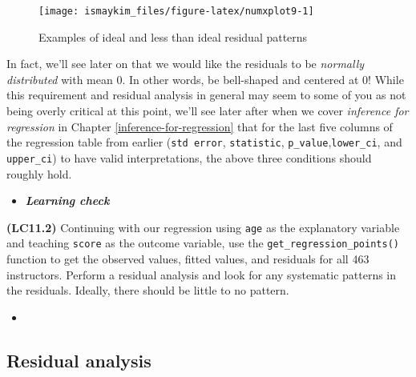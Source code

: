 \documentclass[12pt, krantz2,]{krantz}
\makeatletter
\newenvironment{Shaded}{\begin{snugshade}}{\end{snugshade}}
\newcommand{\CommentTok}[1]{\textcolor[rgb]{0.37,0.37,0.37}{\textit{#1}}}
\newcommand{\DataTypeTok}[1]{\textcolor[rgb]{0.27,0.27,0.27}{#1}}
\newcommand{\DecValTok}[1]{\textcolor[rgb]{0.06,0.06,0.06}{#1}}
\newcommand{\KeywordTok}[1]{\textcolor[rgb]{0.27,0.27,0.27}{\textbf{#1}}}
\newcommand{\NormalTok}[1]{#1}
\newcommand{\OperatorTok}[1]{\textcolor[rgb]{0.43,0.43,0.43}{\textbf{#1}}}
\newcommand{\StringTok}[1]{\textcolor[rgb]{0.5,0.5,0.5}{#1}}
\newenvironment{kframe}{%
\medskip{}
\setlength{\fboxsep}{.8em}
 \def\at@end@of@kframe{}%
 \ifinner\ifhmode%
  \def\at@end@of@kframe{\end{minipage}}%
  \begin{minipage}{\columnwidth}%
 \fi\fi%
 \def\FrameCommand##1{\hskip\@totalleftmargin \hskip-\fboxsep
 \colorbox{shadecolor}{##1}\hskip-\fboxsep
     \hskip-\linewidth \hskip-\@totalleftmargin \hskip\columnwidth}%
 \MakeFramed {\advance\hsize-\width
   \@totalleftmargin\z@ \linewidth\hsize
   \@setminipage}}%
 {\par\unskip\endMakeFramed%
 \at@end@of@kframe}
\renewenvironment{Shaded}{\begin{kframe}}{\end{kframe}}
\newenvironment{rmdblock}[1]
  {\begin{shaded*}
  \begin{itemize}
  \renewcommand{\labelitemi}{
    \raisebox{-.7\height}[0pt][0pt]{
    }
  }
  \item
  }
  {
  \end{itemize}
  \end{shaded*}
  }
\newenvironment{learncheck}
  {\begin{rmdblock}{warning}}
  {\end{rmdblock}}
\makeatother
\begin{document}
\begin{figure}

{\centering \texttt{[image: ismaykim\_files/figure-latex/numxplot9-1]} 

}

\caption{Examples of ideal and less than ideal residual patterns}\label{fig:numxplot9}
\end{figure}

In fact, we'll see later on that we would like the residuals to be \emph{normally distributed} with
mean 0. In other words, be bell-shaped and centered at 0! While this requirement and residual analysis in general may seem to some of you as not being overly critical at this point, we'll see later after when we cover \emph{inference for regression} in Chapter \ref{inference-for-regression} that for the last five columns of the regression table from earlier (\texttt{std\ error}, \texttt{statistic}, \texttt{p\_value},\texttt{lower\_ci}, and \texttt{upper\_ci}) to have valid interpretations, the above three conditions should roughly hold.

\begin{learncheck}
\textbf{\emph{Learning check}}
\end{learncheck}

\textbf{(LC11.2)} Continuing with our regression using \texttt{age} as the explanatory variable and teaching \texttt{score} as the outcome variable, use the \texttt{get\_regression\_points()} function to get the observed values, fitted values, and residuals for all 463 instructors. Perform a residual analysis and look for any systematic patterns in the residuals. Ideally, there should be little to no pattern.

\begin{learncheck}

\end{learncheck}

\hypertarget{model2residuals}{%
\subsection{Residual analysis}\label{model2residuals}}

\begin{Shaded}
\end{Shaded}
\end{document}
